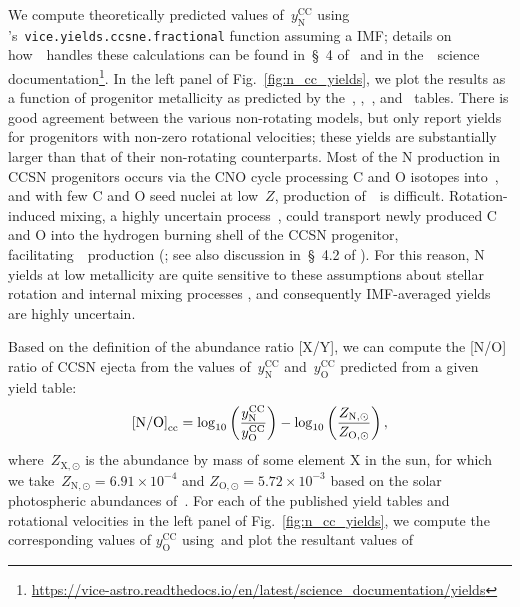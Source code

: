 \documentclass[ms.tex]{subfiles}
\begin{document}
We compute theoretically predicted values of~$y_\text{N}^\text{CC}$ using
\vice's~\texttt{vice.yields.ccsne.fractional} function assuming a
\citet{Kroupa2001} IMF; details on how~\vice~handles these calculations can be
found in~\S~4 of~\citet{Griffith2021} and in the~\vice~science 
documentation\footnote{
\url{https://vice-astro.readthedocs.io/en/latest/science_documentation/yields}
}.
In the left panel of Fig.~\ref{fig:n_cc_yields}, we plot the results as a
function of progenitor metallicity as predicted by the~\citet{Woosley1995},
\citet*{Nomoto2013},~\citet{Sukhbold2016}, and~\citet{Limongi2018} tables.
There is good agreement between the various non-rotating models, but only
\citet{Limongi2018} report yields for progenitors with non-zero rotational
velocities; these yields are substantially larger than that of their
non-rotating counterparts.
Most of the N production in CCSN progenitors occurs via the CNO cycle
processing C and O isotopes into~\Nfourteen, and with few C and O seed nuclei
at low~$Z$, production of~\Nfourteen~is difficult.
Rotation-induced mixing, a highly uncertain process~\citep{Zahn1992, Maeder1998,
Lagarde2012}, could transport newly produced C and O into the hydrogen burning
shell of the CCSN progenitor, facilitating~\Nfourteen~production
(\citealp{Frischknecht2016}; see also discussion in~\S~4.2 of
\citealp{Andrews2017}).
For this reason, N yields at low metallicity are quite sensitive to these
assumptions about stellar rotation and internal mixing processes
\citep{Heger2010}, and consequently IMF-averaged yields are highly uncertain.
\par
Based on the definition of the abundance ratio [X/Y], we can compute the [N/O]
ratio of CCSN ejecta from the values of~$y_\text{N}^\text{CC}$
and~$y_\text{O}^\text{CC}$ predicted from a given yield table:
\begin{equation}
\text{[N/O]}_\text{cc} = 
\log_{10}\left(\frac{y_\text{N}^\text{CC}}{y_\text{O}^\text{CC}}\right) -
\log_{10}\left(\frac{Z_{\text{N},\odot}}{Z_{\text{O},\odot}}\right),
\label{eq:no_subcc}
\end{equation}
where~$Z_{\text{X},\odot}$ is the abundance by mass of some element X in the
sun, for which we take~$Z_{\text{N},\odot} = 6.91\times10^{-4}$ and
$Z_{\text{O},\odot} = 5.72\times10^{-3}$ based on the solar photospheric
abundances of~\citet{Asplund2009}.
For each of the published yield tables and rotational velocities in the left
panel of Fig.~\ref{fig:n_cc_yields}, we compute the corresponding values of
$y_\text{O}^\text{CC}$ using~\vice and plot the resultant values of 
\end{document}
